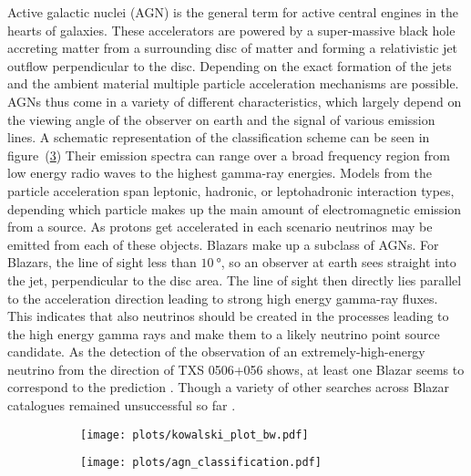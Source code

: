Active galactic nuclei (AGN) is the general term for active central engines in the hearts of galaxies.
These accelerators are powered by a super-massive black hole accreting matter from a surrounding disc of matter and forming a relativistic jet outflow perpendicular to the disc.
Depending on the exact formation of the jets and the ambient material multiple particle acceleration mechanisms are possible.
AGNs thus come in a variety of different characteristics, which largely depend on the viewing angle of the observer on earth and the signal of various emission lines.
A schematic representation of the classification scheme can be seen in figure~(\ref{fig:astro_agns})
Their emission spectra can range over a broad frequency region from low energy radio waves to the highest gamma-ray energies.
Models from the particle acceleration span leptonic, hadronic, or leptohadronic interaction types, depending which particle makes up the main amount of electromagnetic emission from a source.
As protons get accelerated in each scenario neutrinos may be emitted from each of these objects.
Blazars make up a subclass of AGNs.
For Blazars, the line of sight less than $\SI{10}{\degree}$, so an observer at earth sees straight into the jet, perpendicular to the disc area.
The line of sight then directly lies parallel to the acceleration direction leading to strong high energy gamma-ray fluxes.
This indicates that also neutrinos should be created in the processes leading to the high energy gamma rays and make them to a likely neutrino point source candidate.
As the detection of the observation of an extremely-high-energy neutrino from the direction of TXS 0506+056 shows, at least one Blazar seems to correspond to the prediction .
Though a variety of other searches across Blazar catalogues remained unsuccessful so far .


\begin{figure}[htbp]
  \centering
  \begin{subfigure}[t]{0.49\textwidth}
    \centering
    \texttt{[image: plots/kowalski\_plot\_bw.pdf]}
    \label{fig:astro_kowalski_plot}
  \end{subfigure}
  \hfill
  \begin{subfigure}[t]{0.49\textwidth}
    \centering
    \texttt{[image: plots/agn\_classification.pdf]}
    \label{fig:astro_agns}
  \end{subfigure}
\end{figure}


